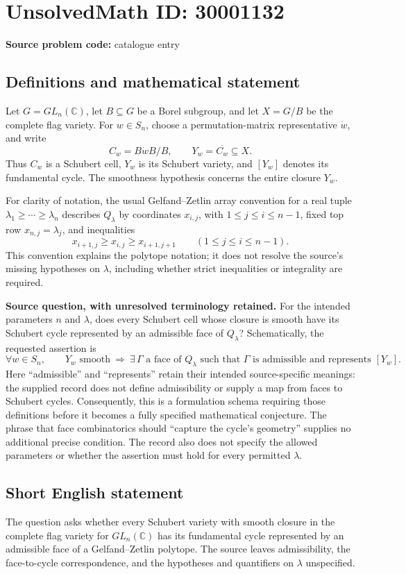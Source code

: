 \documentclass[11pt]{article}
\newcommand{\C}{\mathbb{C}}
\begin{document}
\section*{UnsolvedMath ID: 30001132}
\textbf{Source problem code:} catalogue entry
\subsection{Definitions and mathematical statement}
Let \(G=GL_n(\C)\), let \(B\subseteq G\) be a Borel subgroup, and let \(X=G/B\) be the complete flag variety. For \(w\in S_n\), choose a permutation-matrix representative \(\dot w\), and write
\[
C_w=B\dot wB/B,\qquad Y_w=\overline{C_w}\subseteq X.
\]
Thus \(C_w\) is a Schubert cell, \(Y_w\) is its Schubert variety, and \([Y_w]\) denotes its fundamental cycle. The smoothness hypothesis concerns the entire closure \(Y_w\).

For clarity of notation, the usual Gelfand--Zetlin array convention for a real tuple \(\lambda_1\geq\cdots\geq\lambda_n\) describes \(Q_\lambda\) by coordinates \(x_{i,j}\), with \(1\leq j\leq i\leq n-1\), fixed top row \(x_{n,j}=\lambda_j\), and inequalities
\[
x_{i+1,j}\geq x_{i,j}\geq x_{i+1,j+1}
\qquad(1\leq j\leq i\leq n-1).
\]
This convention explains the polytope notation; it does not resolve the source's missing hypotheses on \(\lambda\), including whether strict inequalities or integrality are required.

\textbf{Source question, with unresolved terminology retained.} For the intended parameters \(n\) and \(\lambda\), does every Schubert cell whose closure is smooth have its Schubert cycle represented by an admissible face of \(Q_\lambda\)? Schematically, the requested assertion is
\[
\forall w\in S_n,\qquad
Y_w\text{ smooth}
\ \Longrightarrow\ 
\exists\,\Gamma\text{ a face of }Q_\lambda
\text{ such that }\Gamma\text{ is admissible and represents }[Y_w].
\]
Here ``admissible'' and ``represents'' retain their intended source-specific meanings: the supplied record does not define admissibility or supply a map from faces to Schubert cycles. Consequently, this is a formulation schema requiring those definitions before it becomes a fully specified mathematical conjecture. The phrase that face combinatorics should ``capture the cycle's geometry'' supplies no additional precise condition. The record also does not specify the allowed parameters or whether the assertion must hold for every permitted \(\lambda\).
\subsection{Short English statement}
The question asks whether every Schubert variety with smooth closure in the complete flag variety for \(GL_n(\C)\) has its fundamental cycle represented by an admissible face of a Gelfand--Zetlin polytope. The source leaves admissibility, the face-to-cycle correspondence, and the hypotheses and quantifiers on \(\lambda\) unspecified.
\end{document}
